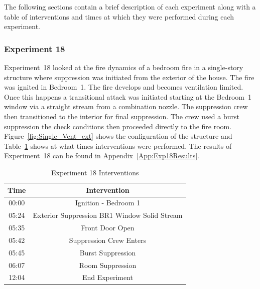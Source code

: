 \documentclass[12pt,oneside]{book}
\begin{document}
The following sections contain a brief description of each experiment along with a table of interventions and times at which they were performed during each experiment. 

\FloatBarrier

\subsubsection{Experiment 18}
Experiment~18 looked at the fire dynamics of a bedroom fire in a single-story structure where suppression was initiated from the exterior of the house. The fire was ignited in Bedroom~1. The fire develops and becomes ventilation limited. Once this happens a transitional attack was initiated starting at the Bedroom~1 window via a straight stream from a combination nozzle.  The suppression crew then transitioned to the interior for final suppression. The crew used a burst suppression the check conditions then proceeded directly to the fire room. Figure~\ref{fig:Single_Vent_ext} shows the configuration of the structure and Table~\ref{Table:Exp18Interventions} shows at what times interventions were performed. The results of Experiment~18 can be found in Appendix~\ref{App:Exp18Results}. 


\begin{table}[H]
	\centering
	\caption{Experiment 18 Interventions}
	\begin{tabular}{|c|c|} 
		\hline
		Time & Intervention \\ \hline \hline
		00:00 & Ignition - Bedroom 1 \\ \hline
		05:24 & Exterior Suppression BR1 Window Solid Stream \\ \hline
		05:35 & Front Door Open \\ \hline
		05:42 & Suppression Crew Enters\\ \hline
		05:45 & Burst Suppression \\ \hline 
		06:07 & Room Suppression \\ \hline
		12:04 & End Experiment\\ \hline
	\end{tabular}
	\label{Table:Exp18Interventions}
\end{table}

\FloatBarrier
\end{document}
